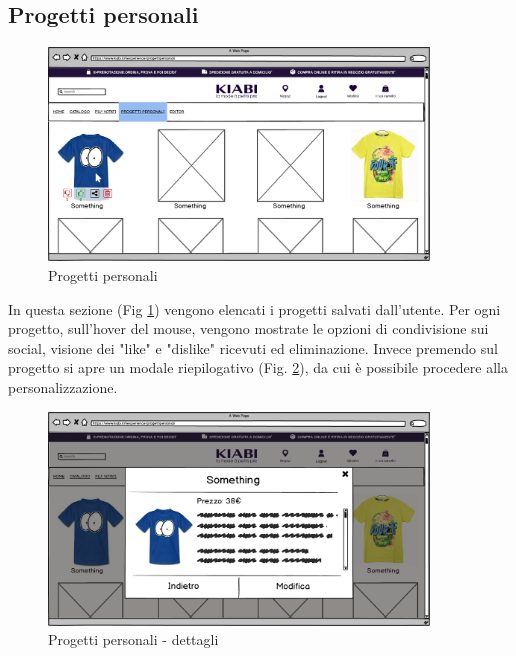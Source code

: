 \documentclass[12pt,italian,]{report}
\begin{document}
\newpage
\hypertarget{progetti-personali}{%
\subsection{Progetti personali}\label{progetti-personali}}

\begin{figure}[h]
\centering
\includegraphics[width=0.9\textwidth]{../balsamiq/balsamiq_finale/ProgettiPersonali.png}
\caption{Progetti personali}
\label{prog-pers}
\end{figure}

In questa sezione (Fig \ref{prog-pers}) vengono elencati i progetti salvati dall'utente. Per ogni progetto, sull'hover del mouse, vengono mostrate le opzioni di condivisione sui social, visione dei "like" e "dislike" ricevuti ed eliminazione. Invece premendo sul progetto si apre un modale riepilogativo (Fig. \ref{prog-pers-dett}), da cui è possibile procedere alla personalizzazione.

\begin{figure}[h]
\centering
\includegraphics[width=0.9\textwidth]{../balsamiq/balsamiq_finale/ProgettiPersonalidetails.png}
\caption{Progetti personali - dettagli}
\label{prog-pers-dett}
\end{figure}
\end{document}
